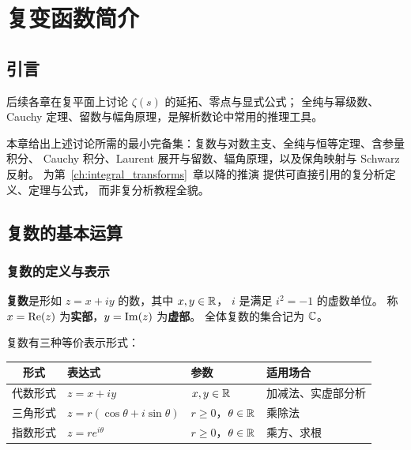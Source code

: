 

\chapter{复变函数简介}\label{ch:complex_analysis_intro}

\section*{引言}\label{sec:intro_complex_analysis}

后续各章在复平面上讨论 $\zeta(s)$ 的延拓、零点与显式公式；
全纯与幂级数、Cauchy 定理、留数与幅角原理，是解析数论中常用的推理工具。

本章给出上述讨论所需的最小完备集：复数与对数主支、全纯与恒等定理、含参量积分、
Cauchy 积分、Laurent 展开与留数、辐角原理，以及保角映射与 Schwarz 反射。
为第~\ref{ch:integral_transforms}~章以降的推演
提供可直接引用的复分析定义、定理与公式，
而非复分析教程全貌。

\section{复数的基本运算}

\subsection{复数的定义与表示}

\textbf{复数}是形如 $z = x + iy$ 的数，其中 $x,y\in\mathbb{R}$，
$i$ 是满足 $i^2=-1$ 的虚数单位。
称 $x=\operatorname{Re}\!\left(z\right)$ 为\textbf{实部}，$y=\operatorname{Im}\!\left(z\right)$ 为\textbf{虚部}。
全体复数的集合记为 $\mathbb{C}$。

复数有三种等价表示形式：

\begin{center}
\renewcommand{\arraystretch}{1.8}
\begin{tabular}{clll}
\toprule
形式 & 表达式 & 参数 & 适用场合 \\
\midrule
代数形式 & $z = x+iy$ & $x,y\in\mathbb{R}$ & 加减法、实虚部分析 \\
三角形式 & $z = r(\cos\theta+i\sin\theta)$ & $r\ge0$，$\theta\in\mathbb{R}$ & 乘除法 \\
指数形式 & $z = re^{i\theta}$ & $r\ge0$，$\theta\in\mathbb{R}$ & 乘方、求根 \\
\bottomrule
\end{tabular}
\end{center}

